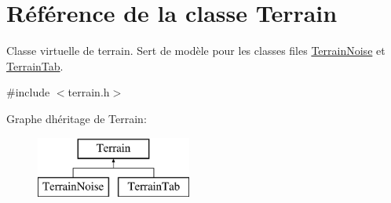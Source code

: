 \hypertarget{class_terrain}{}\section{Référence de la classe Terrain}
\label{class_terrain}


Classe virtuelle de terrain. Sert de modèle pour les classes files \hyperlink{class_terrain_noise}{Terrain\+Noise} et \hyperlink{class_terrain_tab}{Terrain\+Tab}.  




{\ttfamily \#include $<$terrain.\+h$>$}

Graphe d\textquotesingle{}héritage de Terrain\+:\begin{figure}[H]
\begin{center}
\leavevmode
\includegraphics[height=2.000000cm]{class_terrain}
\end{center}
\end{figure}
